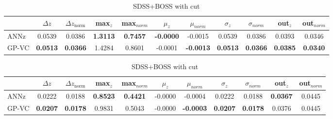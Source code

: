 \documentclass[useAMS,usenatbib,fleqn]{mn2e}
\begin{document}
\begin{center}
\begin{table}
\begin{subtable}{\textwidth}
\begin{tabular}{| l | c | c |  c | c |  c | c |  c | c |  c | c | }
     				&	$\Delta z$	&	$\Delta z_\textrm{norm}$	&	max$_{z}$ & max$_{norm}$		&	$\mu_{z}$&	$\mu_{norm}$	& $\sigma_{z}$ & $\sigma_{norm}$ & out$_{z}$&out$_{norm}$\\	\hline
	{\sc ANNz}		&	0.0539	&	0.0386		&	\textbf{1.3113}		&	\textbf{0.7457}&	\textbf{-0.0000}		&	-0.0015 &	0.0539		&	0.0386&	0.0393		&	0.0346\\
	{\sc GP-VC } 	&	\textbf{0.0513} 	&	\textbf{0.0366}		&	1.4284	&	0.8601 & -0.0001		&	\textbf{-0.0013}&	\textbf{0.0513}		&	\textbf{0.0366}&	\textbf{0.0385} 	&	\textbf{0.0340}\\\hline
  \end{tabular}

\caption{SDSS+BOSS}
\label{table-final-results-boss}
\end{subtable}

\begin{subtable}{\textwidth}
\centering

\begin{tabular}{| l | c | c |  c | c |  c | c |  c | c |  c | c | }
     				&	$\Delta z$	&	$\Delta z_\textrm{norm}$	&	max$_{z}$ & max$_{norm}$		&	$\mu_{z}$&	$\mu_{norm}$	& $\sigma_{z}$ & $\sigma_{norm}$ & out$_{z}$&out$_{norm}$\\	\hline
	{\sc ANNz}		&	0.0222	&	0.0188		&	\textbf{0.8523}		&	\textbf{0.4421}&	-0.0000		&	-0.0004 &	0.0222		&	0.0188&	\textbf{0.0367}		&	0.0445\\
	{\sc GP-VC } 	&	\textbf{0.0207} 	&	\textbf{0.0178}		&	0.9831	&	0.5043 & -0.0000		&	\textbf{-0.0003}&	\textbf{0.0207}		&	\textbf{0.0178}&	0.0376 	&	0.0445\\\hline
  \end{tabular}

\caption{SDSS+BOSS with cut}
\label{table-final-results-boss-cut}
\end{subtable}


\label{table-final-results}
\end{table}
\end{center}
\end{document}
